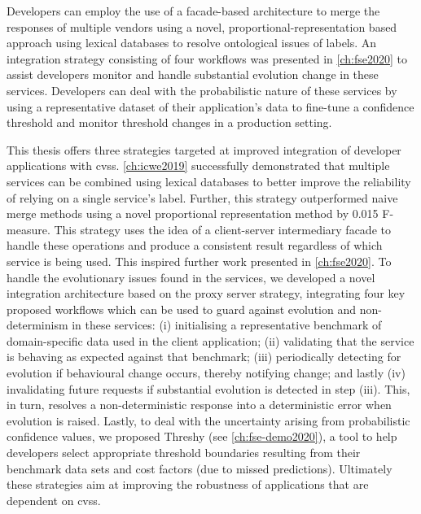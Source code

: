 
\begin{callout}
Developers can employ the use of a facade-based architecture to merge the responses of \textup{multiple} vendors using a novel, proportional-representation based approach using lexical databases to resolve ontological issues of labels. An integration strategy consisting of four workflows was presented in \cref{ch:fse2020} to assist developers monitor and handle substantial evolution change in these services. Developers can deal with the probabilistic nature of these services by using a representative dataset of their application's data to fine-tune a confidence threshold and monitor threshold changes in a production setting.
\end{callout}

This thesis offers three strategies targeted at improved integration of developer applications with \glspl{cvs}. \cref{ch:icwe2019} successfully demonstrated that multiple services can be combined using lexical databases to better improve the reliability of relying on a single service's label. Further, this strategy outperformed naive merge methods using a novel proportional representation method by 0.015 F-measure. This strategy uses the idea of a client-server intermediary facade to handle these operations and produce a consistent result regardless of which service is being used. This inspired further work presented in \cref{ch:fse2020}. To handle the evolutionary issues found in the services, we developed a novel integration architecture based on the proxy server strategy, integrating four key proposed workflows which can be used to guard against evolution and non-determinism in these services: (i) initialising a representative benchmark of domain-specific data used in the client application; (ii) validating that the service is behaving as expected against that benchmark; (iii) periodically detecting for evolution if behavioural change occurs, thereby notifying change; and lastly (iv) invalidating future requests if substantial evolution is detected in step (iii). This, in turn, resolves a non-deterministic response into a deterministic error when evolution is raised. Lastly, to deal with the uncertainty arising from probabilistic confidence values, we proposed Threshy (see \cref{ch:fse-demo2020}), a tool to help developers select appropriate threshold boundaries resulting from their benchmark data sets and cost factors (due to missed predictions). Ultimately these strategies aim at improving the robustness of applications that are dependent on \glspl{cvs}.

